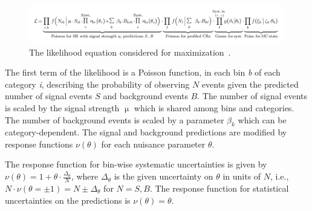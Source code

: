 


%

\begin{figure}[tp]
  \centering
  \includegraphics[width=0.99\textwidth]{figures/likelihood/equation}
  \caption{The likelihood equation considered for maximization~\cite{HIGG-2013-13}.}
  \label{fig:results-likelihood-eqn}
\end{figure}

The first term of the likelihood is a Poisson function, in each bin \textit{b} of each category \textit{i}, describing the probability of observing $N$ events given the predicted number of signal events $S$ and background events $B$. The number of signal events is scaled by the signal strength $\upmu$ which is shared among bins and categories. The number of background events is scaled by a parameter $\beta_k$ which can be category-dependent. The signal and background predictions are modified by response functions $\nu(\theta)$ for each nuisance parameter $\theta$. 

The response function for bin-wise systematic uncertainties is given by $\nu(\theta) = 1 + \theta\cdot\frac{\Delta_\theta}{N}$, where $\Delta_\theta$ is the given uncertainty on $\theta$ in units of $N$, i.e., $N\cdot\nu(\theta = \pm 1) = N \pm \Delta_\theta$ for $N=S,B$. The response function for statistical uncertainties on the predictions is $\nu(\theta) = \theta$.

